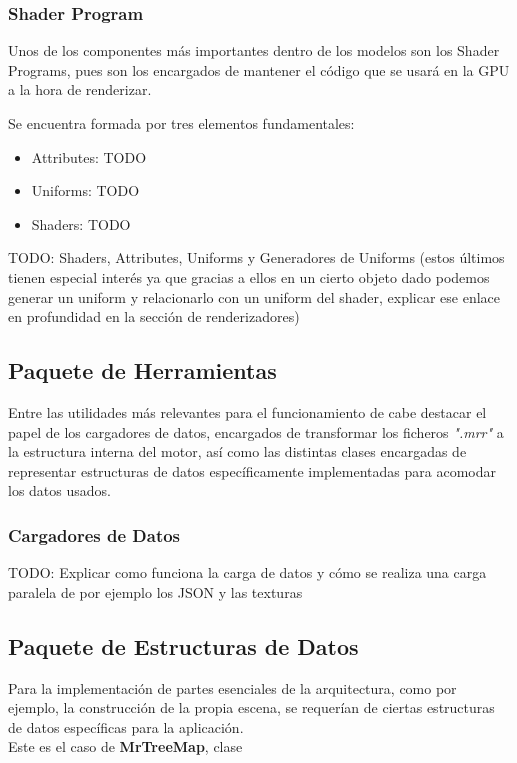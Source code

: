 \subsubsection{Shader Program}
Unos de los componentes más importantes dentro de los modelos son los Shader Programs, pues son los encargados de mantener el código que se usará en la GPU a la hora de renderizar.

Se encuentra formada por tres elementos fundamentales:
\begin{itemize}
\item Attributes: TODO
\item Uniforms: TODO
\item Shaders: TODO
\end{itemize}




TODO: Shaders, Attributes, Uniforms y Generadores de Uniforms (estos últimos tienen especial interés ya que gracias a ellos en un cierto objeto dado podemos generar un uniform y relacionarlo con un uniform del shader, explicar ese enlace en profundidad en la sección de renderizadores)

\subsection{Paquete de Herramientas}
Entre las utilidades más relevantes para el funcionamiento de \robotto cabe destacar el papel de los cargadores de datos, encargados de transformar los ficheros \textit{".mrr"} a la estructura interna del motor, así como las distintas clases encargadas de representar estructuras de datos específicamente implementadas para acomodar los datos usados.

\subsubsection{Cargadores de Datos}

TODO: Explicar como funciona la carga de datos y cómo se realiza una carga paralela de por ejemplo los JSON y las texturas

\subsection{Paquete de Estructuras de Datos}
Para la implementación de partes esenciales de la arquitectura, como por ejemplo, la construcción de la propia escena, se requerían de ciertas estructuras de datos específicas para la aplicación.\\
Este es el caso de \textbf{MrTreeMap}, clase 

